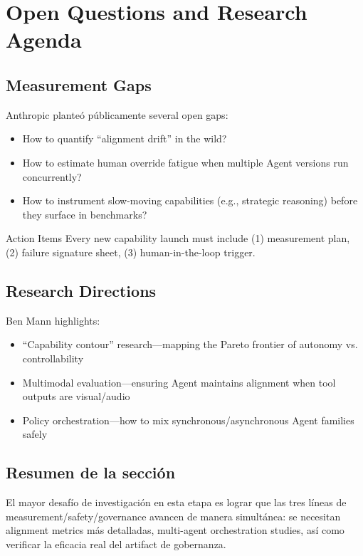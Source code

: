 \section{Open Questions and Research Agenda}

\subsection{Measurement Gaps}

Anthropic planteó públicamente several open gaps:

\begin{itemize}
    \item How to quantify ``alignment drift'' in the wild?
    \item How to estimate human override fatigue when multiple Agent versions run concurrently?
    \item How to instrument slow-moving capabilities (e.g., strategic reasoning) before they surface in benchmarks?
\end{itemize}

\begin{knowledgebox}{Action Items}
Every new capability launch must include (1) measurement plan, (2) failure signature sheet, (3) human-in-the-loop trigger.
\end{knowledgebox}

\subsection{Research Directions}

Ben Mann highlights:

\begin{itemize}
    \item ``Capability contour'' research—mapping the Pareto frontier of autonomy vs. controllability
    \item Multimodal evaluation—ensuring Agent maintains alignment when tool outputs are visual/audio
    \item Policy orchestration—how to mix synchronous/asynchronous Agent families safely
\end{itemize}

\subsection{Resumen de la sección}

El mayor desafío de investigación en esta etapa es lograr que las tres líneas de measurement/safety/governance avancen de manera simultánea: se necesitan alignment metrics más detalladas, multi-agent orchestration studies, así como verificar la eficacia real del artifact de gobernanza.

